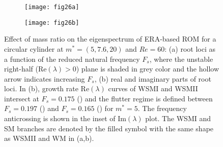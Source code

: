 \documentclass{jfm}
\newcommand{\reddashdot}{\raisebox{2pt}{\tikz{\draw[red,dashdotted,line width=1.2pt](0,0) -- (5mm,0);}}}
\newcommand{\reddash}{\raisebox{2pt}{\tikz{\draw[red,dashed,line width=1.2pt](0,0) -- (5mm,0);}}}
\newcommand{\reddot}{\raisebox{2pt}{\tikz{\draw[red,dotted,line width=1.2pt](0,0) -- (5mm,0);}}}
\begin{document}
\begin{figure}
\centering
\begin{subfigure}{0.495\textwidth}
\centering
    \texttt{[image: fig26a]}
    \caption{}
    \label{fig:dfms_eig1}
    \end{subfigure} 
\begin{subfigure}{0.495\textwidth} 
\centering
 \texttt{[image: fig26b]}
	\caption{}
	\label{fig:dfms_eig23}
	\end{subfigure}	
        \caption{Effect of mass ratio on the eigenspectrum of ERA-based ROM for a circular cylinder at $m^*=(5,7.6,20)$ and $Re=60$: 
        (a) root loci as a function of the reduced natural frequency $F_s$, 
         where the unstable right-half (Re$(\lambda) > 0$) plane is shaded in grey color  
         and the hollow arrow indicates increasing $F_s$, 
         (b) real and imaginary parts of root loci. 
        In (b), growth rate Re$(\lambda)$ curves of WSMI and WSMII intersect at $F_s=0.175$ ({\protect\reddash}) and 
        the flutter regime is defined between $F_s=0.197$ ({\protect\reddashdot})
        and $F_s=0.165$ ({\protect\reddot}) for $m^*=5$.  The frequency anticrossing 
        is shown in the inset of Im$(\lambda)$ plot.
        The WSMI and SM branches are denoted by the filled symbol with the same shape 
        as WSMII and WM in (a,b). }
	\label{fig:dfms_eig}
\end{figure}





\end{document}
